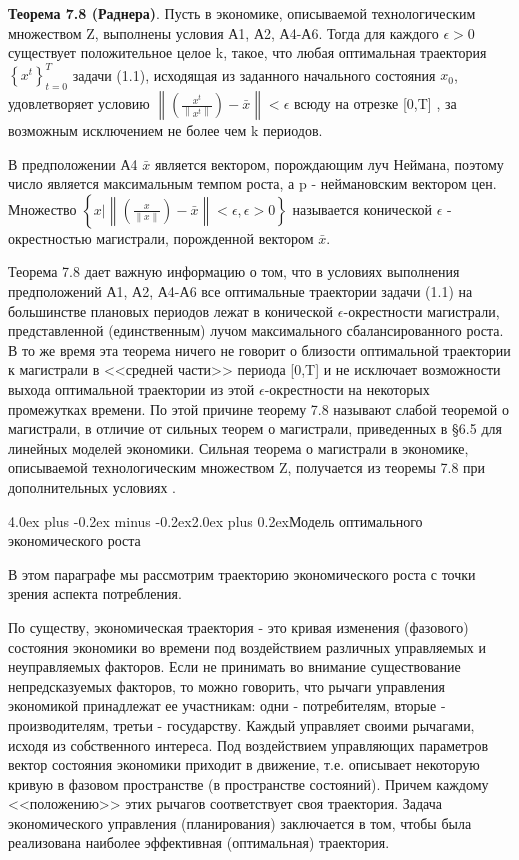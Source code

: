\documentclass[12pt, 4paper]{book}
\makeatletter
\renewcommand{\section}{\@startsection{section}{1}{1pt}%
	{4.0ex plus -0.2ex minus -0.2ex}{2.0ex plus 0.2ex}{\centering\bf}}%
\makeatother
\begin{document}
{\textbf{Теорема 7.8 (Раднера)}. Пусть в экономике, описываемой технологическим множеством Z, выполнены условия А1, А2, А4-А6. Тогда для каждого $\epsilon > 0$ существует положительное целое k, такое, что любая оптимальная траектория $\left\{ x^t \right\}_{t=0}^T$ задачи (1.1), исходящая из заданного начального состояния $x_0$, удовлетворяет условию $\left\|(\frac{x^t}{\left\|x^t \right\|}) - \bar{x} \right\| < \epsilon$ всюду на отрезке [0,T] , за возможным исключением не более чем k периодов.
\par

В предположении А4 $\bar{x}$ является вектором, порождающим луч Неймана, поэтому число  является максимальным темпом роста, а p - неймановским вектором цен. Множество $\left\{x|\left\|(\frac{x}{\left\|x\right\|})-\bar{x}\right\| < \epsilon, \epsilon > 0 \right\}$ называется конической $\epsilon$ - окрестностью магистрали, порожденной вектором $\bar{x}$.
\par

Теорема 7.8 дает важную информацию о том, что в условиях выполнения предположений А1, А2, А4-А6 все оптимальные траектории задачи (1.1) на большинстве плановых периодов лежат в конической $\epsilon$-окрестности магистрали, представленной (единственным) лучом максимального сбалансированного роста. В то же время эта теорема ничего не говорит о близости оптимальной траектории к магистрали в <<средней части>> периода [0,T] и не исключает возможности выхода оптимальной траектории из этой $\epsilon$-окрестности на некоторых промежутках времени. По этой причине теорему 7.8 называют слабой теоремой о магистрали, в отличие от сильных теорем о магистрали, приведенных в §6.5 для линейных моделей экономики. Сильная теорема о магистрали в экономике, описываемой технологическим множеством Z, получается из теоремы 7.8 при дополнительных условиях .
\newpage
\begin{center}
\section{Модель оптимального экономического роста}
\end{center}
\par

В этом параграфе мы рассмотрим траекторию экономического роста с точки зрения аспекта потребления.
\par

По существу, экономическая траектория - это кривая изменения (фазового) состояния экономики во времени под воздействием различных управляемых и неуправляемых факторов. Если не принимать во внимание существование непредсказуемых факторов, то можно говорить, что рычаги управления экономикой принадлежат ее участникам: одни - потребителям, вторые - производителям, третьи - государству. Каждый управляет своими рычагами, исходя из собственного интереса. Под воздействием управляющих параметров вектор состояния экономики приходит в движение, т.е. описывает некоторую кривую в фазовом пространстве (в пространстве состояний). Причем каждому <<положению>> этих рычагов соответствует своя траектория. Задача экономического управления (планирования) заключается в том, чтобы была реализована наиболее эффективная (оптимальная) траектория.
\par

}
\end{document}
